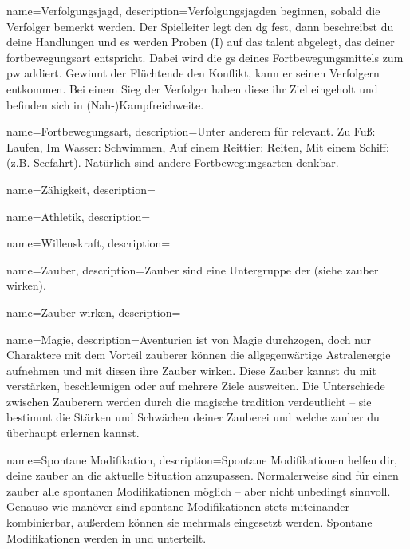 
{
    name={Verfolgungsjagd},
    description={Verfolgungsjagden beginnen, sobald die Verfolger bemerkt werden. Der Spielleiter legt den \gls{dg} fest, dann beschreibst du deine Handlungen und es werden Proben (\gls{I}) auf das \gls{talent} abgelegt, das deiner \gls{fortbewegungsart} entspricht. Dabei wird die \gls{gs} deines Fortbewegungsmittels zum \gls{pw} addiert. Gewinnt der Flüchtende den Konflikt, kann er seinen Verfolgern entkommen. Bei einem Sieg der Verfolger haben diese ihr Ziel eingeholt und befinden sich in (Nah-)Kampfreichweite.}}

{
    name={Fortbewegungsart},
    description={Unter anderem für  relevant. Zu Fuß: Laufen, Im Wasser: Schwimmen, Auf einem Reittier: Reiten, Mit einem Schiff:  (z.B. Seefahrt). Natürlich sind andere Fortbewegungsarten denkbar.}}
        
    

{
    name={Zähigkeit},
    description={}}


{
    name={Athletik},
    description={}}

{
    name={Willenskraft},
    description={}}
        
        

{
    name={Zauber},
    description={Zauber sind eine Untergruppe der  (siehe \gls{zauber wirken}).}}

{
    name={Zauber wirken},
    description={}}
        

{
    name={Magie},
    description={Aventurien ist von Magie durchzogen, doch nur Charaktere mit dem Vorteil \gls{zauberer} können die allgegenwärtige Astralenergie aufnehmen und mit diesen  ihre Zauber wirken. Diese Zauber kannst du mit  verstärken, beschleunigen oder auf mehrere Ziele ausweiten. Die Unterschiede zwischen Zauberern werden durch die \gls{magische tradition} verdeutlicht – sie bestimmt die Stärken und Schwächen deiner Zauberei und welche \gls{zauber} du überhaupt erlernen kannst.}}

{
    name={Spontane Modifikation},
    description={Spontane Modifikationen helfen dir, deine \gls{zauber} an die aktuelle Situation anzupassen. Normalerweise sind für einen \gls{zauber} alle spontanen Modifikationen möglich – aber nicht unbedingt sinnvoll. Genauso wie \gls{manöver} sind spontane Modifikationen stets miteinander kombinierbar, außerdem können sie mehrmals eingesetzt werden. Spontane Modifikationen werden in  und  unterteilt.}}

